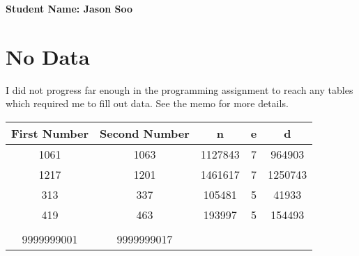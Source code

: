 \documentclass[11pt]{article}
\begin{document}
	\textbf{Student Name: Jason Soo}
	\section{No Data} %
	\label{sec:algorithm}
	I did not progress far enough in the programming assignment to reach any tables which required me to fill out data.  See the memo for more details.
	
	\begin{table}
		\begin{tabular}{|c|c|c|c|c|}
		\hline
		 \textbf{First Number} & \textbf{Second Number} & \textbf{n} & \textbf{e} & \textbf{d}\\
		\hline
		 1061 & 1063 & 1127843 & 7 & 964903\\
		\hline
		 1217 & 1201 & 1461617 & 7 & 1250743\\
		 \hline
		 313 & 337 & 105481 & 5 & 41933\\
		\hline
		 419 & 463 & 193997 & 5 & 154493\\\\
		 9999999001 & 9999999017 &  &  &  
		\end{tabular}
	\end{table}
	
\end{document}
